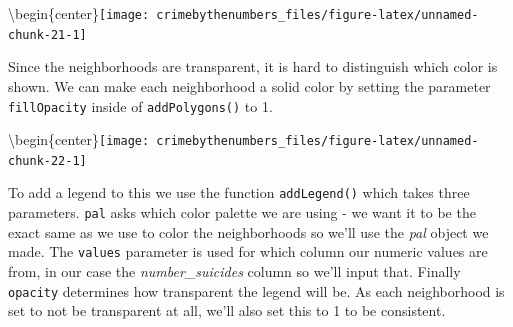\documentclass[
  12pt,
  openany]{book}
\newenvironment{Shaded}{\begin{snugshade}}{\end{snugshade}}
\newcommand{\AttributeTok}[1]{\textcolor[rgb]{0.61,0.61,0.61}{#1}}
\newcommand{\DecValTok}[1]{\textcolor[rgb]{0.06,0.06,0.06}{#1}}
\newcommand{\FunctionTok}[1]{\textcolor[rgb]{0,0,0}{#1}}
\newcommand{\NormalTok}[1]{#1}
\newcommand{\OtherTok}[1]{\textcolor[rgb]{0.37,0.37,0.37}{#1}}
\newcommand{\SpecialCharTok}[1]{\textcolor[rgb]{0,0,0}{#1}}
\newcommand{\StringTok}[1]{\textcolor[rgb]{0.5,0.5,0.5}{#1}}
\begin{document}
\textbackslash begin\{center\}\texttt{[image: crimebythenumbers\_files/figure-latex/unnamed-chunk-21-1]}

Since the neighborhoods are transparent, it is hard to distinguish which color is shown. We can make each neighborhood a solid color by setting the parameter \texttt{fillOpacity} inside of \texttt{addPolygons()} to 1.

\begin{Shaded}
\end{Shaded}

\textbackslash begin\{center\}\texttt{[image: crimebythenumbers\_files/figure-latex/unnamed-chunk-22-1]}

To add a legend to this we use the function \texttt{addLegend()} which takes three parameters. \texttt{pal} asks which color palette we are using - we want it to be the exact same as we use to color the neighborhoods so we'll use the \emph{pal} object we made. The \texttt{values} parameter is used for which column our numeric values are from, in our case the \emph{number\_suicides} column so we'll input that. Finally \texttt{opacity} determines how transparent the legend will be. As each neighborhood is set to not be transparent at all, we'll also set this to 1 to be consistent.
\end{document}
